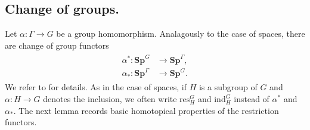 \subsection{Change of groups.}
Let $\alpha:\Gamma\to G$ be a group homomorphism.
Analagously to the case of spaces, there are change of group
functors
\begin{align}\label{eq:spectrumrestrictioninduction}
\begin{split}
\alpha^\ast:\mathbf{Sp}^G  &\to \mathbf{Sp}^\Gamma,\\
\alpha_\ast:\mathbf{Sp}^\Gamma  &\to \mathbf{Sp}^G.
\end{split}
\end{align}
We refer to \cite[Construction~6.5 and Construction~6.7, \pno~1519]{rvadams}
for details.
As in the case of spaces, if $H$ is a subgroup of $G$ and $\alpha:H\to G$ denotes the inclusion,
we often write $\mathrm{res}^G_H$ and $\mathrm{ind}^G_H$ instead of
$\alpha^\ast$ and $\alpha_\ast$.
The next lemma records basic
homotopical properties of the restriction functors.

